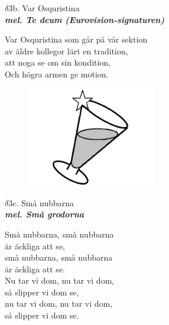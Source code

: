 \documentclass[a6paper,10pt]{article}
\newcommand{\mel}[1]{\small\textbf{\textit{mel. #1 \\}}}
\begin{document}
\newpage
\setlength{\oddsidemargin}{-0.37in}
\noindent
\begin{center}
\Large $\delta3$b. Var Osquristina \\ 
\mel{Te deum (Eurovision-signaturen)}
\end{center}
Var Osquristina som går på vår sektion \\
av äldre kollegor lärt en tradition, \\
att noga se om sin kondition, \\
Och högra armen ge motion. 
\begin{figure}[!h]
\centering
\includegraphics[width=0.5\textwidth]{nubbe.png}
\end{figure}
\begin{center}
\Large $\delta3$c. Små nubbarna \\ 
\mel{Små grodorna}
\end{center}
Små nubbarna, små nubbarna \\
är äckliga att se, \\
små nubbarna, små nubbarna \\
är äckliga att se.
\vspace{5pt}\\
Nu tar vi dom, nu tar vi dom, \\
så slipper vi dom se, \\
nu tar vi dom, nu tar vi dom, \\
så slipper vi dom se.
\end{document}
